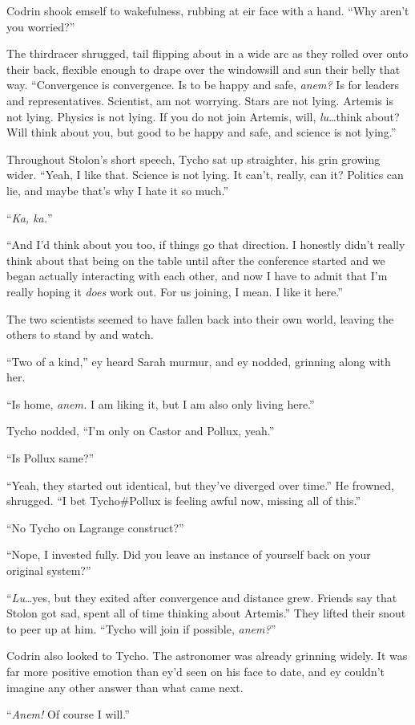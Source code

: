Codrin shook emself to wakefulness, rubbing at eir face with a hand. ``Why aren't you worried?''

The thirdracer shrugged, tail flipping about in a wide arc as they rolled over onto their back, flexible enough to drape over the windowsill and sun their belly that way. ``Convergence is convergence. Is to be happy and safe, \emph{anem?} Is for leaders and representatives. Scientist, am not worrying. Stars are not lying. Artemis is not lying. Physics is not lying. If you do not join Artemis, will, \emph{lu}\ldots think about? Will think about you, but good to be happy and safe, and science is not lying.''

Throughout Stolon's short speech, Tycho sat up straighter, his grin growing wider. ``Yeah, I like that. Science is not lying. It can't, really, can it? Politics can lie, and maybe that's why I hate it so much.''

``\emph{Ka, ka.}''

``And I'd think about you too, if things go that direction. I honestly didn't really think about that being on the table until after the conference started and we began actually interacting with each other, and now I have to admit that I'm really hoping it \emph{does} work out. For us joining, I mean. I like it here.''

The two scientists seemed to have fallen back into their own world, leaving the others to stand by and watch.

``Two of a kind,'' ey heard Sarah murmur, and ey nodded, grinning along with her.

``Is home, \emph{anem.} I am liking it, but I am also only living here.''

Tycho nodded, ``I'm only on Castor and Pollux, yeah.''

``Is Pollux same?''

``Yeah, they started out identical, but they've diverged over time.'' He frowned, shrugged. ``I bet Tycho\#Pollux is feeling awful now, missing all of this.''

``No Tycho on Lagrange construct?''

``Nope, I invested fully. Did you leave an instance of yourself back on your original system?''

``\emph{Lu}\ldots yes, but they exited after convergence and distance grew. Friends say that Stolon got sad, spent all of time thinking about Artemis.'' They lifted their snout to peer up at him. ``Tycho will join if possible, \emph{anem?}''

Codrin also looked to Tycho. The astronomer was already grinning widely. It was far more positive emotion than ey'd seen on his face to date, and ey couldn't imagine any other answer than what came next.

``\emph{Anem!} Of course I will.''
